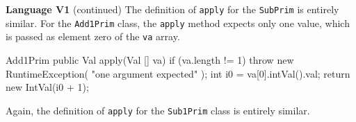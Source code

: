 \begin{minipage}[t]{\sw}
\slidenumber
\LARGE
{\bf Language V1} (continued)\exx
The definition of \verb'apply' for the \verb'SubPrim'
is entirely similar.\exx
For the \verb'Add1Prim' class,
the \verb'apply' method expects only one value,
which is passed as element zero of the \verb'va' array.
\begin{qv}
Add1Prim
    public Val apply(Val [] va) {
        if (va.length != 1)
            throw new RuntimeException(
                "one argument expected"
            );
        int i0 = va[0].intVal().val;
        return new IntVal(i0 + 1);
    }
\end{qv}
\LARGE
Again, the definition of \verb'apply' for the \verb'Sub1Prim' class
is entirely similar.
\end{minipage}
